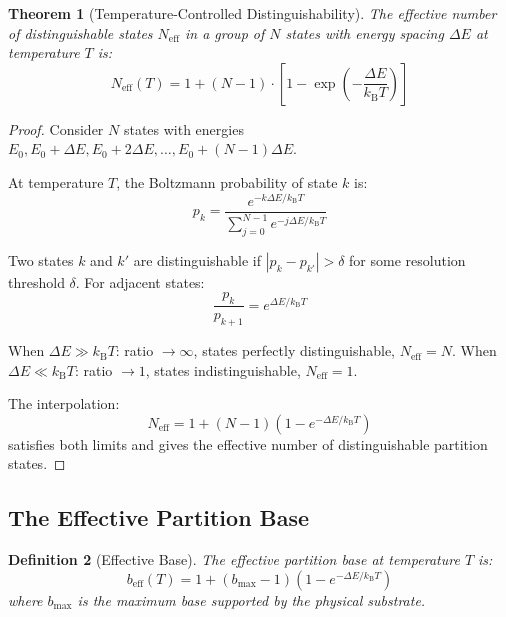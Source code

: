 \documentclass[twocolumn,10pt]{article}
\newtheorem{theorem}{Theorem}[section]
\newtheorem{definition}[theorem]{Definition}
\theoremstyle{remark}
\newcommand{\kB}{k_{\mathrm{B}}}
\begin{document}
\begin{theorem}[Temperature-Controlled Distinguishability]
\label{thm:temp_distinguish}
The effective number of distinguishable states $N_{\text{eff}}$ in a group of $N$ states with energy spacing $\Delta E$ at temperature $T$ is:
\begin{equation}
    N_{\text{eff}}(T) = 1 + (N-1) \cdot \left[1 - \exp\left(-\frac{\Delta E}{\kB T}\right)\right]
\end{equation}
\end{theorem}

\begin{proof}
Consider $N$ states with energies $E_0, E_0 + \Delta E, E_0 + 2\Delta E, \ldots, E_0 + (N-1)\Delta E$.

At temperature $T$, the Boltzmann probability of state $k$ is:
\begin{equation}
    p_k = \frac{e^{-k\Delta E / \kB T}}{\sum_{j=0}^{N-1} e^{-j\Delta E / \kB T}}
\end{equation}

Two states $k$ and $k'$ are distinguishable if $|p_k - p_{k'}| > \delta$ for some resolution threshold $\delta$. For adjacent states:
\begin{equation}
    \frac{p_k}{p_{k+1}} = e^{\Delta E / \kB T}
\end{equation}

When $\Delta E \gg \kB T$: ratio $\to \infty$, states perfectly distinguishable, $N_{\text{eff}} = N$.
When $\Delta E \ll \kB T$: ratio $\to 1$, states indistinguishable, $N_{\text{eff}} = 1$.

The interpolation:
\begin{equation}
    N_{\text{eff}} = 1 + (N-1)(1 - e^{-\Delta E/\kB T})
\end{equation}
satisfies both limits and gives the effective number of distinguishable partition states.
\end{proof}

\subsection{The Effective Partition Base}

\begin{definition}[Effective Base]
\label{def:eff_base}
The effective partition base at temperature $T$ is:
\begin{equation}
    b_{\text{eff}}(T) = 1 + (b_{\max} - 1)(1 - e^{-\Delta E / \kB T})
\end{equation}
where $b_{\max}$ is the maximum base supported by the physical substrate.
\end{definition}
\end{document}
